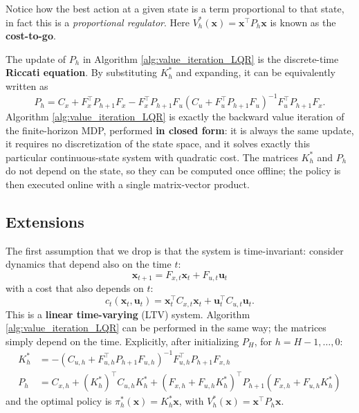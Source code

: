 \documentclass[10pt, a4paper]{report}
\begin{document}
Notice how the best action at a given state is a term proportional to that state, in fact this is a \textit{proportional regulator}. Here $V_h^*(\mathbf x)=\mathbf x^\top P_h\mathbf x$ is known as the \textbf{cost-to-go}.
\begin{boxobservation}
    The update of $P_h$ in Algorithm \ref{alg:value_iteration_LQR} is the discrete-time \textbf{Riccati equation}. By substituting $K_h^*$ and expanding, it can be equivalently written as\begin{equation}
        P_h=C_x+F_x^\top P_{h+1}F_x-F_x^\top P_{h+1}F_u\left(C_u+F_u^\top P_{h+1}F_u\right)^{-1}F_u^\top P_{h+1}F_x.
    \end{equation}
    Algorithm \ref{alg:value_iteration_LQR} is exactly the backward value iteration of the finite-horizon MDP, performed \textbf{in closed form}: it is always the same update, it requires no discretization of the state space, and it solves exactly this particular continuous-state system with quadratic cost. The matrices $K_h^*$ and $P_h$ do not depend on the state, so they can be computed once offline; the policy is then executed online with a single matrix-vector product.
\end{boxobservation}

\subsection{Extensions}
The first assumption that we drop is that the system is time-invariant: consider dynamics that depend also on the time $t$:\begin{equation}
     \mathbf x_{t+1}=F_{x,t}\mathbf x_t+F_{u,t}\mathbf u_t
\end{equation}
with a cost that also depends on $t$:\begin{equation}
    c_t(\mathbf x_t,\mathbf u_t)=\mathbf x_t^\top C_{x,t}\mathbf x_t+
    \mathbf u_t^\top C_{u,t}\mathbf u_t.
\end{equation}
This is a \textbf{linear time-varying} (LTV) system. Algorithm \ref{alg:value_iteration_LQR} can be performed in the same way; the matrices simply depend on the time. Explicitly, after initializing $P_H$, for $h=H-1,\dots,0$:\begin{align}
    K_h^*&=-(C_{u,h}+F_{u,h}^\top P_{h+1}F_{u,h})^{-1}F_{u,h}^\top P_{h+1}F_{x,h}\\
    P_h&=C_{x,h}+(K_h^*)^\top C_{u,h}K_h^*+(F_{x,h}+F_{u,h}K_h^*)^\top P_{h+1}(F_{x,h}+F_{u,h}K_h^*)
\end{align}
and the optimal policy is $\pi_h^*(\mathbf x)=K_h^*\mathbf x$, with $V_h^*(\mathbf x)=\mathbf x^\top P_h\mathbf x$.\bigskip
\end{document}
